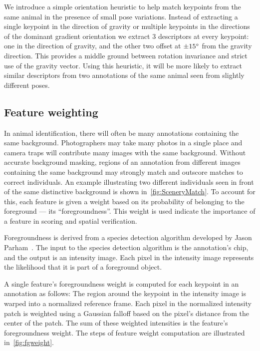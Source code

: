         We introduce a simple orientation heuristic to help match keypoints from the same animal in the presence of
        small pose variations. Instead of extracting a single keypoint in the direction of gravity or multiple
        keypoints in the directions of the dominant gradient orientation we extract 3 descriptors at every
        keypoint: one in the direction of gravity, and the other two offset at $\pm15^{\circ}$ from the gravity
        direction. This provides a middle ground between rotation invariance and strict use of the gravity vector.
        Using this heuristic, it will be more likely to extract similar descriptors from two annotations of the
        same animal seen from slightly different poses.

    \subsection{Feature weighting}
     
        In animal identification, there will often be many annotations containing the same background.
        Photographers may take many photos in a single place and camera traps will contribute many images with the
        same background. Without accurate background masking, regions of an annotation from different images
        containing the same background may strongly match and outscore matches to correct individuals. An example
        illustrating two different individuals seen in front of the same distinctive background is shown
        in~\cref{fig:SceneryMatch}. To account for this, each feature is given a weight based on its probability of
        belonging to the foreground --- its ``foregroundness''. This weight is used indicate the importance of a
        feature in scoring and spatial verification.

        Foregroundness is derived from a species detection algorithm developed by Jason
        Parham~\cite{parham_photographic_2015}. The input to the species detection algorithm is the annotation's
        chip, and the output is an intensity image. Each pixel in the intensity image represents the likelihood
        that it is part of a foreground object.

        A single feature's foregroundness weight is computed for each keypoint in an annotation as follows: The
        region around the keypoint in the intensity image is warped into a normalized reference frame. Each pixel
        in the normalized intensity patch is weighted using a Gaussian falloff based on the pixel's distance from
        the center of the patch. The sum of these weighted intensities is the feature's foregroundness weight. The
        steps of feature weight computation are illustrated in~\cref{fig:fgweight}.

